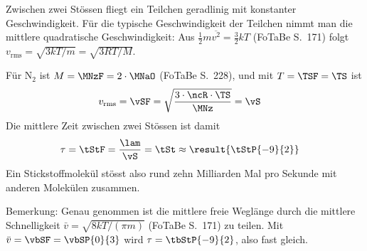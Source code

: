 Zwischen zwei Stössen fliegt ein Teilchen geradlinig mit konstanter Geschwindigkeit. Für die typische Geschwindigkeit der Teilchen nimmt man die mittlere quadratische Geschwindigkeit: Aus $\frac{1}{2}m\overline{v^2} = \frac{3}{2}kT$ (FoTaBe S.~171) folgt $v_\text{rms} = \sqrt{3kT/m} = \sqrt{3RT/M}$.

Für $\mathrm{N_2}$ ist $M = \MNzF = 2\cdot\MNaO$ (FoTaBe S.~228), und mit $T = \TSF = \TS$ ist
\begin{align}
 v_\text{rms} &= \vSF = \sqrt{\frac{3\cdot\ncR\cdot\TS}{\MNz}} = \vS
\end{align}
Die mittlere Zeit zwischen zwei Stössen ist damit
\begin{align}
 \tau &= \tStF = \frac{\lam}{\vS} = \tSt \approx \result{\tStP{-9}{2}}
\end{align}
Ein Stickstoffmolekül stösst also rund zehn Milliarden Mal pro Sekunde mit anderen Molekülen zusammen.

Bemerkung: Genau genommen ist die mittlere freie Weglänge durch die mittlere Schnelligkeit $\bar v = \sqrt{8kT/(\pi m)}$ (FoTaBe S.~171) zu teilen. Mit $\bar v = \vbSF = \vbSP{0}{3}$ wird $\tau = \tbStP{-9}{2}$, also fast gleich.
